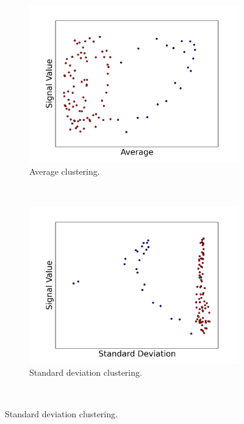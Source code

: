 \documentclass[11pt, letterpaper]{article}            %
\begin{document}
\begin{figure}[htbp]
  \centering
  \begin{subfigure}[b]{0.5\textwidth}
    \includegraphics[width=\textwidth]{./gfx/f1f5.png}
    \caption{Average clustering.\label{fig:Caverage}}
  \end{subfigure}%
  ~ %
  \begin{subfigure}[b]{0.5\textwidth}
    \includegraphics[width=\textwidth]{./gfx/f2f5.png}
    \caption{Standard deviation clustering.\label{fig:Cstandarddeviation}}
  \end{subfigure}
  ~ %

\end{figure}
\end{document}

